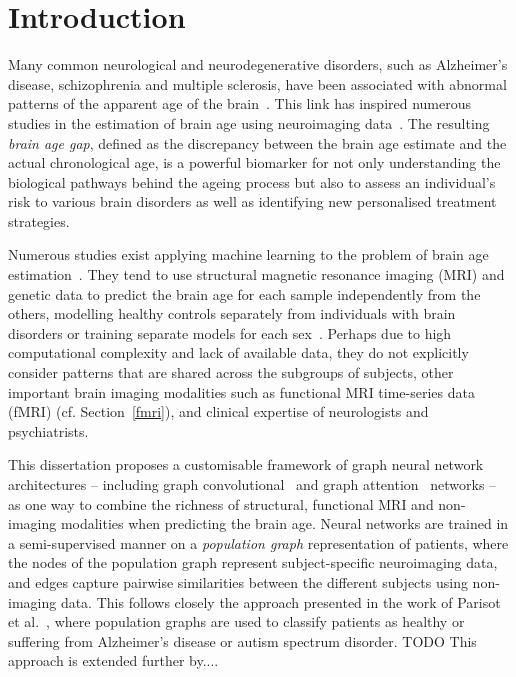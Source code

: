 \chapter{Introduction}



Many common neurological and neurodegenerative disorders, such as Alzheimer’s disease, schizophrenia and multiple sclerosis, have been associated with abnormal patterns of the apparent age of the brain~\cite{kaufmann2019}. This link has inspired numerous studies in the estimation of brain age using neuroimaging data~\cite{franke2019ten}. The resulting \textit{brain age gap}, defined as the discrepancy between the brain age estimate and the actual chronological age, is a powerful biomarker for not only understanding the biological pathways behind the ageing process but also to assess an individual’s risk to various brain disorders as well as identifying new personalised treatment strategies.


Numerous studies exist applying machine learning to the problem of brain age estimation~\cite{franke2019ten}. They tend to use structural magnetic resonance imaging (MRI) and genetic data to predict the brain age for each sample independently from the others, modelling healthy controls separately from individuals with brain disorders or training separate models for each sex~\cite{kaufmann2019,niu2019improved}. Perhaps due to high computational complexity and lack of available data, they do not explicitly consider patterns that are shared across the subgroups of subjects, other important brain imaging modalities such as functional MRI time-series data (fMRI) (cf. Section~\ref{fmri}), and clinical expertise of neurologists and psychiatrists.


This dissertation proposes a customisable framework of graph neural network architectures – including graph convolutional~\cite{kipf2017semi} and graph attention~\cite{velickovic2018graph} networks – as one way to combine the richness of structural, functional MRI and non-imaging modalities when predicting the brain age. Neural networks are trained in a semi-supervised manner on a \textit{population graph} representation of patients, where the nodes of the population graph represent subject-specific neuroimaging data, and edges capture pairwise similarities between the different subjects using non-imaging data. This follows closely the approach presented in the work of Parisot et al.~\cite{parisot2017spectral,parisot2018disease}, where population graphs are used to classify patients as healthy or suffering from Alzheimer's disease or autism spectrum disorder. 
TODO This approach is extended further by.... 

